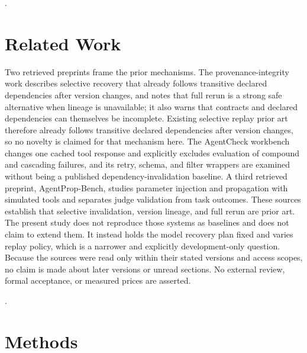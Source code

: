 \documentclass{article}
\begin{document}
\citep{ref0001,ref0002}.

\section{Related Work}

Two retrieved preprints frame the prior mechanisms. The provenance-integrity work describes selective recovery that already follows transitive declared dependencies after version changes, and notes that full rerun is a strong safe alternative when lineage is unavailable; it also warns that contracts and declared dependencies can themselves be incomplete. Existing selective replay prior art therefore already follows transitive declared dependencies after version changes, so no novelty is claimed for that mechanism here. The AgentCheck workbench changes one cached tool response and explicitly excludes evaluation of compound and cascading failures, and its retry, schema, and filter wrappers are examined without being a published dependency-invalidation baseline. A third retrieved preprint, AgentProp-Bench, studies parameter injection and propagation with simulated tools and separates judge validation from task outcomes. These sources establish that selective invalidation, version lineage, and full rerun are prior art. The present study does not reproduce those systems as baselines and does not claim to extend them. It instead holds the model recovery plan fixed and varies replay policy, which is a narrower and explicitly development-only question. Because the sources were read only within their stated versions and access scopes, no claim is made about later versions or unread sections. No external review, formal acceptance, or measured prices are asserted.

\citep{ref0001,ref0002,ref0003}.

\section{Methods}
\end{document}
